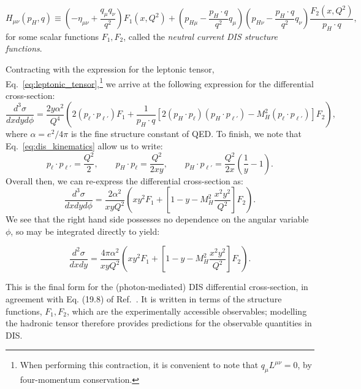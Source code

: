 \documentclass[withindex,glossary]{cam-thesis}
\begin{document}
\begin{equation}
H_{\mu\nu}(p_H, q) \equiv \left( -\eta_{\mu\nu} + \frac{q_{\mu} q_{\nu}}{q^2} \right) F_1(x,Q^2) + \left( p_{H\mu} - \frac{p_H \cdot q}{q^2} q_{\mu} \right) \left( p_{H\nu} - \frac{p_H \cdot q}{q^2} q_{\nu} \right) \frac{F_2(x,Q^2)}{p_H \cdot q},
\end{equation}
for some scalar functions $F_1, F_2$, called the \textit{neutral current DIS structure functions}.

Contracting with the expression for the leptonic tensor, Eq.~\eqref{eq:leptonic_tensor},\footnote{When performing this contraction, it is convenient to note that $q_{\mu} L^{\mu\nu} = 0$, by four-momentum conservation.} we arrive at the following expression for the differential cross-section:
\begin{equation}
\frac{d^3\sigma}{dx dy d\phi} = \frac{2y \alpha^2}{Q^4} \left( 2(p_{\ell} \cdot p_{\ell'}) F_1 + \frac{1}{p_H \cdot q} [2 (p_H \cdot p_{\ell}) (p_H \cdot p_{\ell'}) - M_H^2 (p_{\ell} \cdot p_{\ell'})] F_2 \right),
\end{equation}
where $\alpha = e^2 / 4\pi$ is the fine structure constant of QED. To finish, we note that Eq.~\eqref{eq:dis_kinematics} allow us to write:
\begin{equation}
p_{\ell} \cdot p_{\ell'} = \frac{Q^2}{2}, \qquad p_H \cdot p_{\ell} = \frac{Q^2}{2xy}, \qquad p_H \cdot p_{\ell'} = \frac{Q^2}{2x} \left( \frac{1}{y} - 1 \right). 
\end{equation}
Overall then, we can re-express the differential cross-section as:
\begin{equation}
\frac{d^3\sigma}{dx dy d\phi} = \frac{2\alpha^2}{xy Q^2} \left(xy^2F_1 + \left[1 - y - M_H^2 \frac{x^2y^2}{Q^2}\right] F_2\right).
\end{equation}
We see that the right hand side possesses no dependence on the angular variable $\phi$, so may be integrated directly to yield:
\begin{framed}
\begin{equation}
\frac{d^2\sigma}{dx dy} = \frac{4\pi\alpha^2}{xy Q^2} \left(xy^2F_1 + \left[1 - y - M_H^2 \frac{x^2y^2}{Q^2}\right] F_2 \right).
\end{equation}
\end{framed}
This is the final form for the (photon-mediated) DIS differential cross-section, in agreement with Eq. (19.8) of Ref.~\cite{ParticleDataGroup:2022pth}. It is written in terms of the structure functions, $F_1, F_2$, which are the experimentally accessible observables; modelling the hadronic tensor therefore provides predictions for the observable quantities in DIS.
\end{document}

